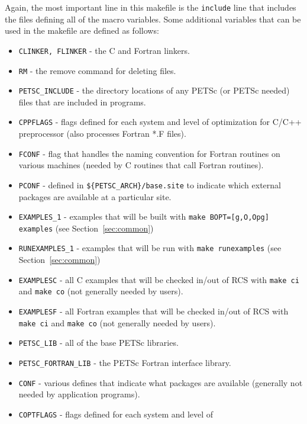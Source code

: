 {Again, the most important line in this makefile is the {\tt include}
line that includes the files defining all of the macro variables.
Some additional variables that can be used in the makefile are defined
as follows:
\begin{itemize}
\item {\tt CLINKER, FLINKER} - the C and Fortran linkers. 
\item {\tt RM} - the remove command for deleting files.
\item {\tt PETSC\_INCLUDE} - the directory locations of any PETSc (or PETSc
            needed) files that are included in programs. 
\item {\tt CPPFLAGS} - flags defined for each system and level of 
                       optimization for C/C++ preprocessor (also processes Fortran *.F files).
\item {\tt FCONF} - flag that handles the naming convention for Fortran routines
                    on various machines (needed by C routines that call 
                    Fortran routines).
\item {\tt PCONF} - defined in {\tt \$\{PETSC\_ARCH\}/base.site} to 
            indicate which external packages are available at a particular site.
\item {\tt EXAMPLES\_1} - examples that will be built with
             {\tt make BOPT=[g,O,Opg] examples} (see Section~\ref{sec:common})
\item {\tt RUNEXAMPLES\_1} - examples that will be run with
             {\tt make runexamples} (see Section~\ref{sec:common})
\item {\tt EXAMPLESC} - all C examples that will be checked in/out of RCS
             with {\tt make ci} and {\tt make co} (not generally
             needed by users).
\item {\tt EXAMPLESF} - all Fortran examples that will be checked in/out of
             RCS with {\tt make ci} and {\tt make co} (not generally
             needed by users).
\item {\tt PETSC\_LIB} - all of the base PETSc libraries.
\item {\tt PETSC\_FORTRAN\_LIB} - the PETSc Fortran interface 
             library. 
\item {\tt CONF} - various defines that indicate what packages are available
           (generally not needed by application programs).
\item {\tt COPTFLAGS} - flags defined for each system and level of 

\end{itemize}}
